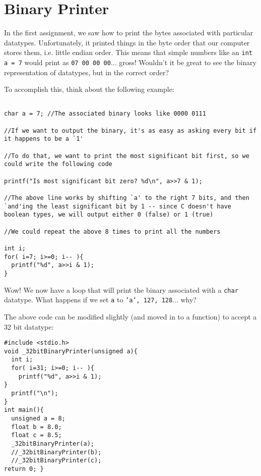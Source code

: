 \documentclass[10pt]{article}
\begin{document}
\section*{Binary Printer}

In the first assignment, we saw how to print the bytes associated with particular datatypes. Unfortunately, it printed things in the byte order that our computer stores them, i.e. little endian order. This means that simple numbers like an \texttt{int a = 7} would print as \texttt{07 00 00 00}... gross! Wouldn't it be great to see the binary representation of datatypes, but in the correct order?


\noindent To accomplish this, think about the following example:

\begin{lstlisting}

char a = 7; //The associated binary looks like 0000 0111

//If we want to output the binary, it's as easy as asking every bit if it happens to be a `1'

//To do that, we want to print the most significant bit first, so we could write the following code

printf("Is most significant bit zero? %d\n", a>>7 & 1);

//The above line works by shifting `a' to the right 7 bits, and then `and'ing the least significant bit by 1 -- since C doesn't have boolean types, we will output either 0 (false) or 1 (true)

//We could repeat the above 8 times to print all the numbers

int i;
for( i=7; i>=0; i-- ){
  printf("%d", a>>i & 1);
}

\end{lstlisting}


\noindent Wow! We now have a loop that will print the binary associated with a \texttt{char} datatype. What happens if we set \texttt{a} to \texttt{'a', 127, 128}... why?



\noindent The above code can be modified slightly (and moved in to a function) to accept a 32 bit datatype:

\begin{lstlisting}
#include <stdio.h>
void _32bitBinaryPrinter(unsigned a){
  int i;
  for( i=31; i>=0; i-- ){
    printf("%d", a>>i & 1);
}
  printf("\n");
}
int main(){
  unsigned a = 8;
  float b = 8.0;
  float c = 8.5;
  _32bitBinaryPrinter(a);
  //_32bitBinaryPrinter(b);
  //_32bitBinaryPrinter(c);
return 0; }

\end{lstlisting}
\end{document}
